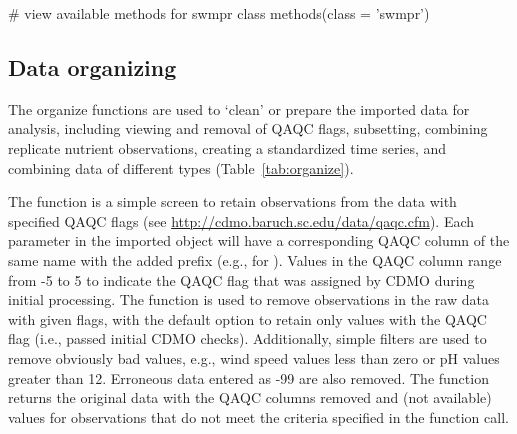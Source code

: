 \begin{example}
# view available methods for swmpr class
methods(class = 'swmpr')
\end{example}

\subsection{Data organizing}

The organize functions are used to `clean' or prepare the imported data for analysis, including viewing and removal of QAQC flags, subsetting, combining replicate nutrient observations, creating a standardized time series, and combining data of different types (Table~\ref{tab:organize}).

The  function is a simple screen to retain observations from the data with specified QAQC flags (see \url{http://cdmo.baruch.sc.edu/data/qaqc.cfm}). Each parameter in the imported  object will have a corresponding QAQC column of the same name with the added prefix  (e.g.,  for ).  Values in the QAQC column range from -5 to 5 to indicate the QAQC flag that was assigned by CDMO during initial processing.  The  function is used to remove observations in the raw data with given flags, with the default option to retain only values with the  QAQC flag (i.e., passed initial CDMO checks).     Additionally, simple filters are used to remove obviously bad values, e.g., wind speed values less than zero or pH values greater than 12. Erroneous data entered as -99 are also removed. The function returns the original data with the QAQC columns removed and  (not available) values for observations that do not meet the criteria specified in the function call.

